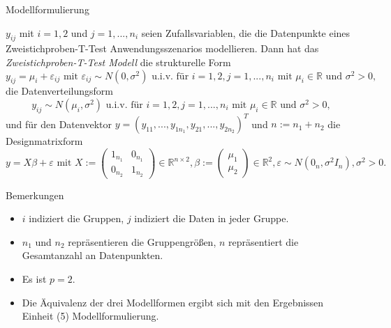 \documentclass[
  8pt,
  ignorenonframetext,
]{beamer}
\providecommand{\tightlist}{%
  \setlength{\itemsep}{0pt}\setlength{\parskip}{0pt}}
\begin{document}
\begin{frame}{Modellformulierung}
\protect\hypertarget{modellformulierung-2}{}
\footnotesize
\begin{definition}
\justifying
$y_{ij}$ mit $i = 1,2$ und $j = 1,...,n_i$ seien Zufallsvariablen, die die Datenpunkte
eines Zweistichproben-T-Test Anwendungsszenarios modellieren. Dann hat das
\textit{Zweistichproben-T-Test Modell} die strukturelle Form
\begin{equation}
y_{ij} = \mu_i + \varepsilon_{ij}
\mbox{ mit } \varepsilon_{ij} \sim N(0,\sigma^2)
\mbox{ u.i.v. für } i = 1,2, j = 1,...,n_i \mbox{ mit } \mu_i \in \mathbb{R} \mbox{ und } \sigma^2 > 0,
\end{equation}
die Datenverteilungsform
\begin{equation}
y_{ij} \sim N(\mu_i,\sigma^2)
\mbox{ u.i.v. für } i = 1,2, j = 1,...,n_i \mbox{ mit } \mu_i \in \mathbb{R} \mbox{ und } \sigma^2 > 0,
\end{equation}
und für den Datenvektor $y = (y_{11}, ...,y_{1n_1}, y_{21}, ...,y_{2n_2})^T$ und $n := n_1 + n_2$ die Designmatrixform
\begin{equation}
y = X\beta + \varepsilon \mbox{ mit }
X     := \begin{pmatrix} 1_{n_1} & 0_{n_1} \\ 0_{n_2} & 1_{n_2} \end{pmatrix} \in \mathbb{R}^{n \times 2},
\beta := \begin{pmatrix} \mu_1 \\ \mu_2 \end{pmatrix} \in \mathbb{R}^2,
\varepsilon \sim N(0_n,\sigma^2I_n),
\sigma^2 > 0.
\end{equation}
\end{definition}

Bemerkungen

\begin{itemize}
\tightlist
\item
  \(i\) indiziert die Gruppen, \(j\) indiziert die Daten in jeder
  Gruppe.
\item
  \(n_1\) und \(n_2\) repräsentieren die Gruppengrößen, \(n\)
  repräsentiert die Gesamtanzahl an Datenpunkten.
\item
  Es ist \(p = 2\).
\item
  Die Äquivalenz der drei Modellformen ergibt sich mit den Ergebnissen
  Einheit (5) Modellformulierung.
\end{itemize}
\end{frame}
\end{document}
